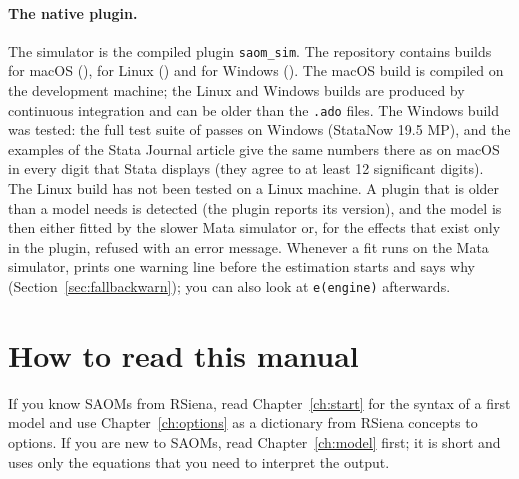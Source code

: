 \paragraph{The native plugin.} The simulator is the compiled plugin \texttt{saom\_sim}. The repository contains builds for macOS (), for Linux () and for Windows (). The macOS build is compiled on the development machine; the Linux and Windows builds are produced by continuous integration and can be older than the \texttt{.ado} files. The Windows build was tested: the full test suite of \nwsaom{} passes on Windows (StataNow 19.5 MP), and the examples of the Stata Journal article give the same numbers there as on macOS in every digit that Stata displays (they agree to at least 12 significant digits). The Linux build has not been tested on a Linux machine. A plugin that is older than a model needs is detected (the plugin reports its version), and the model is then either fitted by the slower Mata simulator or, for the effects that exist only in the plugin, refused with an error message. Whenever a fit runs on the Mata simulator, \nwsaom{} prints one warning line before the estimation starts and says why (Section~\ref{sec:fallbackwarn}); you can also look at \texttt{e(engine)} afterwards.

\section{How to read this manual}

If you know SAOMs from RSiena, read Chapter~\ref{ch:start} for the syntax of a first model and use Chapter~\ref{ch:options} as a dictionary from RSiena concepts to \nwsaom{} options. If you are new to SAOMs, read Chapter~\ref{ch:model} first; it is short and uses only the equations that you need to interpret the output.

